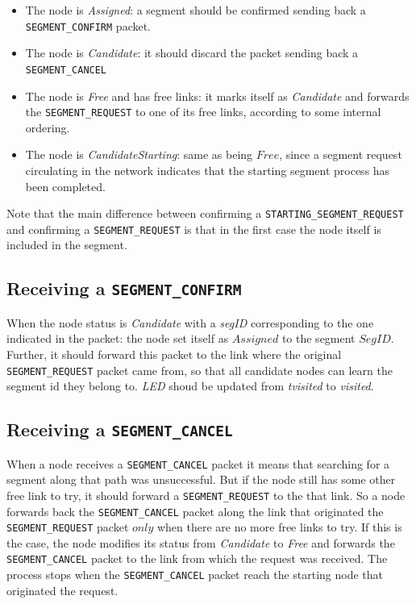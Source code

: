 \begin{itemize}
\item The node is \emph{Assigned}: a segment should be confirmed
sending back a \texttt{SEGMENT\_CONFIRM} packet.
\item The node is \emph{Candidate}: it should discard the packet sending
back a \texttt{SEGMENT\_CANCEL} 
\item The node is \emph{Free} and has free
links: it marks itself as \emph{Candidate} and forwards the \texttt{SEGMENT\_REQUEST}
to one of its free links, according to some internal ordering.
\item The node is \emph{CandidateStarting}: same as being $Free$,
since a segment request circulating in the network indicates that the
starting segment process has been completed.
\end{itemize}

Note that the main difference between confirming a \texttt{STARTING\_SEGMENT\_REQUEST}
and confirming a \texttt{SEGMENT\_REQUEST} is that in the first case the node
itself is included in the segment.


\subsection{Receiving a \texttt{SEGMENT\_CONFIRM}}
When the node status is \emph{Candidate} with a \emph{segID} corresponding to the one indicated in
the packet: the node set itself as $Assigned$ to the segment $SegID$. Further, it should forward this packet to the link where the
original \texttt{SEGMENT\_REQUEST} packet came from, so that all candidate nodes
can learn the segment id they belong to. \emph{LED} shoud be
updated from \emph{tvisited} to \emph{visited}.

\subsection{Receiving a \texttt{SEGMENT\_CANCEL}}
When a node receives a \texttt{SEGMENT\_CANCEL} packet it means that
searching for a segment along that path was unsuccessful. But if the
node still has some other free link to try, it should forward a
\texttt{SEGMENT\_REQUEST} to the that link. So a node forwards back
the \texttt{SEGMENT\_CANCEL} packet along the link that originated the
\texttt{SEGMENT\_REQUEST} packet $only$ when there are no more free
links to try. If this is the case, the node modifies its status from
\emph{Candidate} to \emph{Free} and forwards the
\texttt{SEGMENT\_CANCEL} packet to the link from which the request was
received. The process stops when the \texttt{SEGMENT\_CANCEL} packet
reach the starting node that originated the request.

